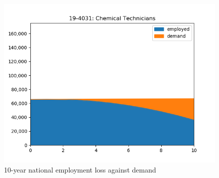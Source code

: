 \documentclass[10pt]{article}
\begin{document}
\begin{figure}[H]
    \includegraphics[scale=0.45]{Chemical_Technicians.png}
    \caption{10-year national employment loss against demand}
    \label{fig:graphs}
\end{figure}
\end{document}
